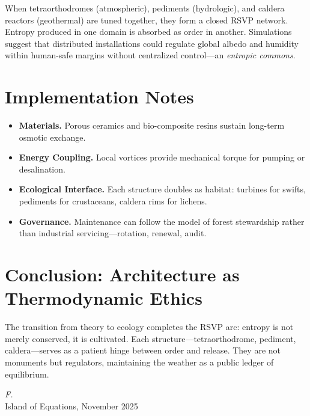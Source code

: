 \documentclass[12pt]{article}
\begin{document}
When tetraorthodromes (atmospheric), pediments (hydrologic),
and caldera reactors (geothermal) are tuned together,
they form a closed RSVP network.
Entropy produced in one domain is absorbed as order in another.
Simulations suggest that distributed installations could regulate
global albedo and humidity within human-safe margins
without centralized control—an \textit{entropic commons}.

\section{Implementation Notes}

\begin{itemize}
\item \textbf{Materials.}  Porous ceramics and bio-composite resins sustain long-term osmotic exchange.
\item \textbf{Energy Coupling.}  Local vortices provide mechanical torque for pumping or desalination.
\item \textbf{Ecological Interface.}  Each structure doubles as habitat: turbines for swifts, pediments for crustaceans, caldera rims for lichens.
\item \textbf{Governance.}  Maintenance can follow the model of forest stewardship rather than industrial servicing—rotation, renewal, audit.
\end{itemize}

\section{Conclusion: Architecture as Thermodynamic Ethics}

The transition from theory to ecology completes the RSVP arc:
entropy is not merely conserved, it is cultivated.
Each structure—tetraorthodrome, pediment, caldera—serves as a patient hinge
between order and release.
They are not monuments but regulators, maintaining the weather
as a public ledger of equilibrium.

\begin{flushright}
\textit{F.}\\
\small Island of Equations, November 2025
\end{flushright}
\end{document}
